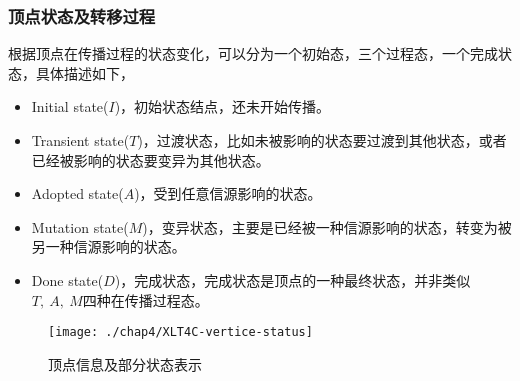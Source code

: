 \subsubsection{顶点状态及转移过程}
\label{sec:xlt4c:state-xtran}
根据顶点在传播过程的状态变化，可以分为一个初始态，三个过程态，一个完成状态，具体描述如下，
\begin{itemize}
\item Initial state($I$)，初始状态结点，还未开始传播。
\item Transient state($T$)，过渡状态，比如未被影响的状态要过渡到其他状态，或者已经被影响的状态要变异为其他状态。
\item Adopted state($A$)，受到任意信源影响的状态。
\item Mutation state($M$)，变异状态，主要是已经被一种信源影响的状态，转变为被另一种信源影响的状态。
\item Done state($D$)，完成状态，完成状态是顶点的一种最终状态，并非类似$T, ~A, ~M$四种在传播过程态。
\end{itemize}

\begin{figure}[H]
	\centering%
	\texttt{[image: ./chap4/XLT4C-vertice-status]}
	\caption{顶点信息及部分状态表示}
	\label{fig:chap4:vertice-status}
\end{figure}


